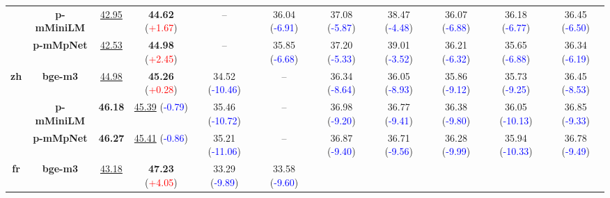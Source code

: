 \begin{table*}[!ht]
{\begin{tabular}{cc|>{\columncolor{gray!15}}c|cccccccc}
& \textbf{p-mMiniLM}
  & \underline{42.95}
  & \textbf{44.62} {\scriptsize(\textcolor{red}{+1.67})}
  & -- 
  & 36.04 {\scriptsize(\textcolor{blue}{-6.91})}
  & 37.08 {\scriptsize(\textcolor{blue}{-5.87})}
  & 38.47 {\scriptsize(\textcolor{blue}{-4.48})}
  & 36.07 {\scriptsize(\textcolor{blue}{-6.88})}
  & 36.18 {\scriptsize(\textcolor{blue}{-6.77})}
  & 36.45 {\scriptsize(\textcolor{blue}{-6.50})} \\
& \textbf{p-mMpNet}
  & \underline{42.53}
  & \textbf{44.98} {\scriptsize(\textcolor{red}{+2.45})}
  & -- 
  & 35.85 {\scriptsize(\textcolor{blue}{-6.68})}
  & 37.20 {\scriptsize(\textcolor{blue}{-5.33})}
  & 39.01 {\scriptsize(\textcolor{blue}{-3.52})}
  & 36.21 {\scriptsize(\textcolor{blue}{-6.32})}
  & 35.65 {\scriptsize(\textcolor{blue}{-6.88})}
  & 36.34 {\scriptsize(\textcolor{blue}{-6.19})} \\
\midrule
\multirow{3}{*}{\textbf{zh}}
& \textbf{bge-m3}
  & \underline{44.98}
  & \textbf{45.26} {\scriptsize(\textcolor{red}{+0.28})}
  & 34.52 {\scriptsize(\textcolor{blue}{-10.46})}
  & -- 
  & 36.34 {\scriptsize(\textcolor{blue}{-8.64})}
  & 36.05 {\scriptsize(\textcolor{blue}{-8.93})}
  & 35.86 {\scriptsize(\textcolor{blue}{-9.12})}
  & 35.73 {\scriptsize(\textcolor{blue}{-9.25})}
  & 36.45 {\scriptsize(\textcolor{blue}{-8.53})} \\
& \textbf{p-mMiniLM}
  & \textbf{46.18}
  & \underline{45.39} {\scriptsize(\textcolor{blue}{-0.79})}
  & 35.46 {\scriptsize(\textcolor{blue}{-10.72})}
  & -- 
  & 36.98 {\scriptsize(\textcolor{blue}{-9.20})}
  & 36.77 {\scriptsize(\textcolor{blue}{-9.41})}
  & 36.38 {\scriptsize(\textcolor{blue}{-9.80})}
  & 36.05 {\scriptsize(\textcolor{blue}{-10.13})}
  & 36.85 {\scriptsize(\textcolor{blue}{-9.33})} \\
& \textbf{p-mMpNet}
  & \textbf{46.27}
  & \underline{45.41} {\scriptsize(\textcolor{blue}{-0.86})}
  & 35.21 {\scriptsize(\textcolor{blue}{-11.06})}
  & -- 
  & 36.87 {\scriptsize(\textcolor{blue}{-9.40})}
  & 36.71 {\scriptsize(\textcolor{blue}{-9.56})}
  & 36.28 {\scriptsize(\textcolor{blue}{-9.99})}
  & 35.94 {\scriptsize(\textcolor{blue}{-10.33})}
  & 36.78 {\scriptsize(\textcolor{blue}{-9.49})} \\
\midrule
\multirow{3}{*}{\textbf{fr}}
& \textbf{bge-m3}
  & \underline{43.18}
  & \textbf{47.23} {\scriptsize(\textcolor{red}{+4.05})}
  & 33.29 {\scriptsize(\textcolor{blue}{-9.89})}
  & 33.58 {\scriptsize(\textcolor{blue}{-9.60})}

\end{tabular}}
\end{table*}
